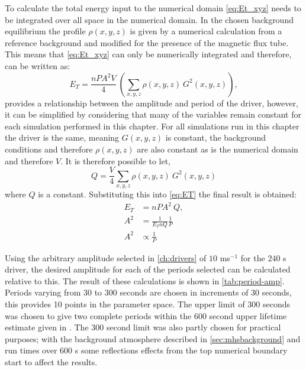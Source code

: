 To calculate the total energy input to the numerical domain \cref{eq:Et_xyz} needs to be integrated over all space in the numerical domain.
In the chosen background equilibrium the profile $\rho(x,y,z)$ is given by a numerical calculation from a reference background and modified for the presence of the magnetic flux tube.
This means that \cref{eq:Et_xyz} can only be numerically integrated and therefore, can be written as:
\begin{equation}
    E_T = \frac{nPA^2V}{4}\ \left( \sum_{x,y,z} \rho(x,y,z)\ G^2(x,y,z) \right),\label{eq:ET}
\end{equation}
 provides a relationship between the amplitude and period of the driver, however, it can be simplified by considering that many of the variables remain constant for each simulation performed in this chapter.
For all simulations run in this chapter the driver is the same, meaning $G(x,y,z)$ is constant, the background conditions and therefore $\rho(x,y,z)$ are also constant as is the numerical domain and therefore $V$.
It is therefore possible to let,
\begin{equation}
    Q = \frac{V}{4} \sum_{x,y,z} \rho(x,y,z)\ G^2(x,y,z)
\end{equation}
where $Q$ is a constant.
Substituting this into \cref{eq:ET} the final result is obtained:
\begin{align}
    E_T &= nPA^2\ Q, \\
    A^2 &= \frac{1}{E_T n Q} \frac{1}{P} \\
    A^2 &\propto \frac{1}{P}
\end{align}

Using the arbitrary amplitude selected in \cref{ch:drivers} of $10$ ms$^{-1}$ for the $240$ s driver, the desired amplitude for each of the periods selected can be calculated relative to this.
The result of these calculations is shown in \cref{tab:period-amp}.
Periods varying from $30$ to $300$ seconds are chosen in increments of $30$ seconds, this provides 10 points in the parameter space.
The upper limit of $300$ seconds was chosen to give two complete periods within the $600$ second upper lifetime estimate given in \cite{sanchezalmeida2004}.
The $300$ second limit was also partly chosen for practical purposes; with the background atmosphere described in \cref{sec:mhsbackground} and run times over $600$ s some reflections effects from the top numerical boundary start to affect the results.

